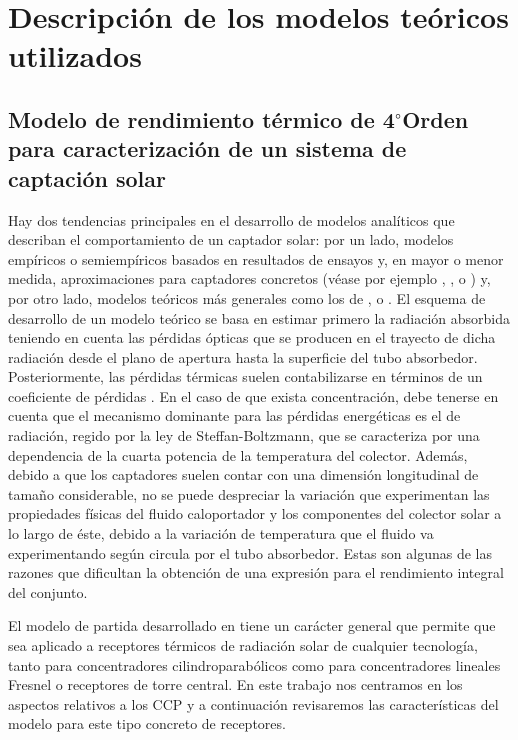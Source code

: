 \chapter{Descripción de los modelos teóricos utilizados}
\label{descripcionmodelos}

\section{Modelo de rendimiento térmico de 4$^{\circ}$Orden para caracterización de un sistema de captación solar}

Hay dos tendencias principales en el desarrollo de modelos analíticos que describan el comportamiento de un captador solar: por un lado, modelos empíricos o semiempíricos basados en resultados de ensayos y, en mayor o menor medida, aproximaciones para captadores concretos (véase por ejemplo \cite{patnodeSimulationPerformanceEvaluation2006}, \cite{dudleyTestResultsSEGS1994}, \cite{burkholderHeatLossTesting2009} o \cite{burkholderHeatLossTestingSolel2008}) y, por otro lado, modelos teóricos más generales como los de  \cite{hottelEvaluationFlatplateSolar1955}, \cite{fraidenraichImprovedSolutionsTemperature1997a} o \cite{kalogirouDetailedThermalModel2012}. El esquema de desarrollo de un modelo teórico se basa  en estimar primero la radiación absorbida teniendo en cuenta las pérdidas ópticas que se producen en el trayecto de dicha radiación desde el plano de apertura hasta la superficie del tubo absorbedor. Posteriormente, las pérdidas térmicas suelen contabilizarse en términos de un coeficiente de pérdidas \cite{duffieSolarEngineeringThermal2006}. En el caso de que exista concentración, debe tenerse en cuenta que el mecanismo dominante para las pérdidas energéticas es el de radiación, regido por la ley de Steffan-Boltzmann, que se caracteriza por una dependencia de la cuarta potencia de la temperatura del colector.  Además, debido a que los captadores suelen contar con una dimensión longitudinal de tamaño considerable, no se puede despreciar la variación que experimentan las propiedades físicas del fluido caloportador y los componentes del colector solar a lo largo de éste, debido a la variación de temperatura que el fluido va experimentando según circula por el tubo absorbedor. Estas son algunas de las razones que dificultan la obtención de una expresión para el rendimiento integral del conjunto. 

El modelo de partida desarrollado en \cite{barberofresnoDesarrolloModeloTeorico2018} tiene un carácter general que permite que sea aplicado a receptores térmicos de radiación solar de cualquier tecnología, tanto para concentradores cilindroparabólicos como para concentradores lineales Fresnel o receptores de torre central. En este trabajo nos centramos en los aspectos relativos a los CCP y a continuación revisaremos las características del modelo para este tipo concreto de receptores.

